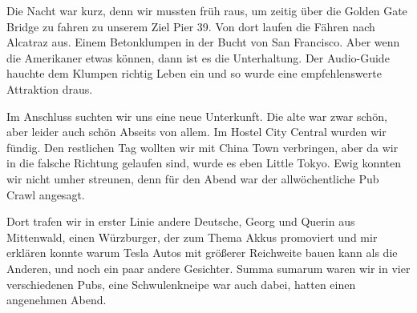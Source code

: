 Die Nacht war kurz, denn wir mussten früh raus, um zeitig über die Golden Gate Bridge zu fahren zu unserem Ziel Pier 39.
Von dort laufen die Fähren nach Alcatraz aus.
Einem Betonklumpen in der Bucht von San Francisco.
Aber wenn die Amerikaner etwas können, dann ist es die Unterhaltung.
Der Audio-Guide hauchte dem Klumpen richtig Leben ein und so wurde eine empfehlenswerte Attraktion draus.

Im Anschluss suchten wir uns eine neue Unterkunft.
Die alte war zwar schön, aber leider auch schön Abseits von allem.
Im Hostel City Central wurden wir fündig.
Den restlichen Tag wollten wir mit China Town verbringen, aber da wir in die falsche Richtung gelaufen sind, wurde es eben Little Tokyo.
Ewig konnten wir nicht umher streunen, denn für den Abend war der allwöchentliche Pub Crawl angesagt.

Dort trafen wir in erster Linie andere Deutsche, Georg und Querin aus Mittenwald, einen Würzburger, der zum Thema Akkus promoviert und mir erklären konnte warum Tesla Autos mit größerer Reichweite bauen kann als die Anderen, und noch ein paar andere Gesichter.
Summa sumarum waren wir in vier verschiedenen Pubs, eine Schwulenkneipe war auch dabei, hatten einen angenehmen Abend.


%
